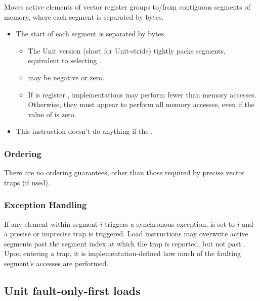 \noindent
Moves active elements of  vector register groups to/from contiguous segments of memory,
where each segment is separated by  bytes.

\begin{itemize}
    \item The start of each segment is separated by  bytes.
    \begin{itemize}
        \item The Unit version (short for Unit-stride) tightly packs segments, equivalent to selecting .
        \item {} may be negative or zero.
        \item If  is register , implementations may perform fewer than  memory accesses. Otherwise, they must appear to perform all memory accesses, even if the value of  is zero.
    \end{itemize}
    \item This instruction doesn't do anything if the .
\end{itemize}


\subsubsection*{Ordering}
There are no ordering guarantees, other than those required by precise vector traps (if used).

\subsubsection*{Exception Handling}
If any element within segment $i$ triggers a synchronous exception,  is set to $i$ and a precise or imprecise trap is triggered.
Load instructions may overwrite active segments past the segment index at which the trap is reported, but not past .\cite[Section 7.7]{specification-RVV-v1.0}
Upon entering a trap, it is implementation-defined how much of the faulting segment's accesses are performed.

\subsection{Unit fault-only-first loads}\label{chap:bg:sec:rvv:fof}

